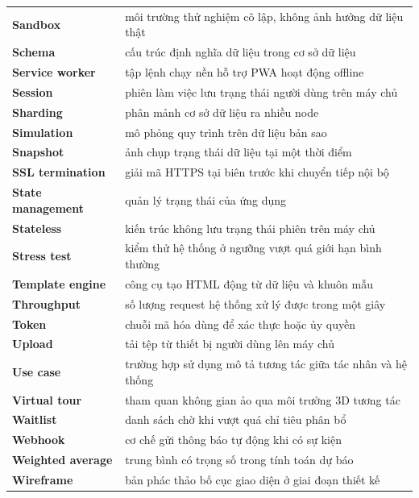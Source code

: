 \documentclass[../DoAn.tex]{subfiles}
\begin{document}
\begin{longtable}{p{4.2cm} p{10.3cm}}
    \textbf{Sandbox}              & môi trường thử nghiệm cô lập, không ảnh hưởng dữ liệu thật \\
    \textbf{Schema}               & cấu trúc định nghĩa dữ liệu trong cơ sở dữ liệu \\
    \textbf{Service worker}       & tập lệnh chạy nền hỗ trợ PWA hoạt động offline \\
    \textbf{Session}              & phiên làm việc lưu trạng thái người dùng trên máy chủ \\
    \textbf{Sharding}             & phân mảnh cơ sở dữ liệu ra nhiều node \\
    \textbf{Simulation}           & mô phỏng quy trình trên dữ liệu bản sao \\
    \textbf{Snapshot}             & ảnh chụp trạng thái dữ liệu tại một thời điểm \\
    \textbf{SSL termination}      & giải mã HTTPS tại biên trước khi chuyển tiếp nội bộ \\
    \textbf{State management}     & quản lý trạng thái của ứng dụng \\
    \textbf{Stateless}            & kiến trúc không lưu trạng thái phiên trên máy chủ \\
    \textbf{Stress test}          & kiểm thử hệ thống ở ngưỡng vượt quá giới hạn bình thường \\
    \textbf{Template engine}      & công cụ tạo HTML động từ dữ liệu và khuôn mẫu \\
    \textbf{Throughput}           & số lượng request hệ thống xử lý được trong một giây \\
    \textbf{Token}                & chuỗi mã hóa dùng để xác thực hoặc ủy quyền \\
    \textbf{Upload}               & tải tệp từ thiết bị người dùng lên máy chủ \\
    \textbf{Use case}             & trường hợp sử dụng mô tả tương tác giữa tác nhân và hệ thống \\
    \textbf{Virtual tour}         & tham quan không gian ảo qua môi trường 3D tương tác \\
    \textbf{Waitlist}             & danh sách chờ khi vượt quá chỉ tiêu phân bổ \\
    \textbf{Webhook}              & cơ chế gửi thông báo tự động khi có sự kiện \\
    \textbf{Weighted average}     & trung bình có trọng số trong tính toán dự báo \\
    \textbf{Wireframe}            & bản phác thảo bố cục giao diện ở giai đoạn thiết kế \\
    \hline
\end{longtable}
\end{document}
